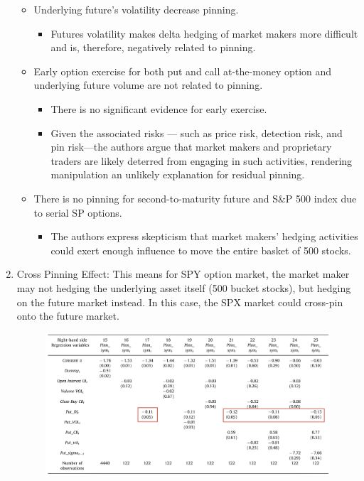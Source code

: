 \documentclass[10pt]{report}
\begin{document}
\begin{enumerate}
\begin{itemize}
\begin{itemize}
        \end{itemize}
        \item Underlying future's volatility decrease pinning.
        \begin{itemize}
            \item Futures volatility makes delta hedging of market makers more difficult and is, therefore, negatively related to pinning.
        \end{itemize}
        \item Early option exercise for both put and call at-the-money option and underlying future volume are not related to pinning.
        \begin{itemize}
            \item There is no significant evidence for early exercise.
            \item Given the associated risks — such as price risk, detection risk, and pin risk—the authors argue that market makers and proprietary traders are likely deterred from engaging in such activities, rendering manipulation an unlikely explanation for residual pinning.
        \end{itemize}
        \item There is no pinning for second-to-maturity future and S\&P 500 index due to serial SP options.
        \begin{itemize}
            \item The authors express skepticism that market makers’ hedging activities could exert enough influence to move the entire basket of 500 stocks.
        \end{itemize}
   \end{itemize}
    \item Cross Pinning Effect: This means for SPY option market, the market maker may not hedging the underlying asset itself (500 bucket stocks), but hedging on the future market instead. In this case, the SPX market could cross-pin onto the future market.
    \begin{figure}[!h]
        \centering
        \includegraphics[width=1\linewidth]{p2.png}

\end{figure}
\end{enumerate}
\end{document}
